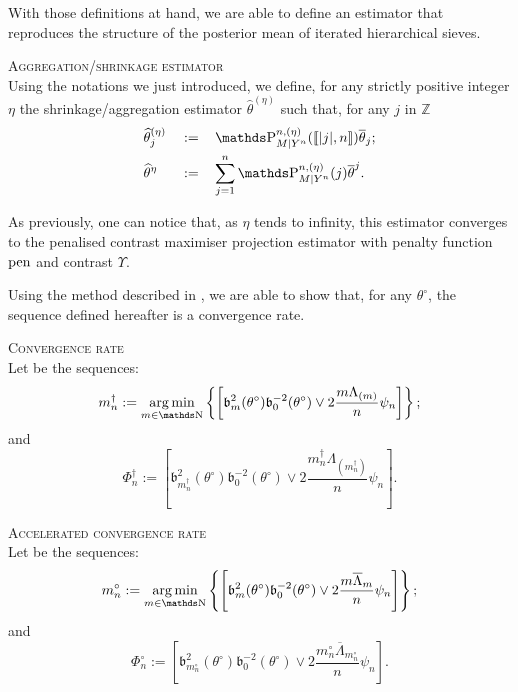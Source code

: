 With those definitions at hand, we are able to define an estimator that reproduces the structure of the posterior mean of iterated hierarchical sieves.

\begin{de}{\textsc{Aggregation/shrinkage estimator} \\}\label{DEFREQ_CIRCDECONV_KNOWN_IID_AGGREGEST}
Using the notations we just introduced, we define, for any strictly positive integer $\eta$ the shrinkage/aggregation estimator $\widehat{\theta}^{(\eta)}$ such that, for any $j$ in $\mathds{Z}$
\begin{alignat*}{3}
& \widehat{\theta}^{(\eta)}_{j} && := && \P_{M \vert Y^{n}}^{n, (\eta)}(\llbracket \vert j \vert, n \rrbracket) \overline{\theta}_{j};\\
& \widehat{\theta}^{\eta} && := && \sum\limits_{j = 1}^{n} \P_{M \vert Y^{n}}^{n, (\eta)}(j) \overline{\theta}^{j}.
\end{alignat*}
\end{de}

As previously, one can notice that, as $\eta$ tends to infinity, this estimator converges to the penalised contrast maximiser projection estimator with penalty function $\operatorname{pen}$ and contrast $\Upsilon$.

Using the method described in , we are able to show that, for any $\theta^{\circ}$, the sequence defined hereafter is a convergence rate.

\begin{de}{\textsc{Convergence rate} \\}\label{DE_FREQ_CIRCDECONV_KNOWN_IID_CONVRATE}
Let be the sequences:
\[m^{\dagger}_{n} := \argmin_{m \in \N}\left\{\left[\mathfrak{b}_{m}^{2}(\theta^{\circ})\mathfrak{b}_{0}^{-2}(\theta^{\circ}) \vee 2 \frac{m \Lambda_{(m)}}{n} \psi_{n}\right]\right\};\]
and
\[\Phi^{\dagger}_{n} := \left[\mathfrak{b}_{m^{\dagger}_{n}}^{2}(\theta^{\circ})\mathfrak{b}_{0}^{-2}(\theta^{\circ}) \vee 2 \frac{m^{\dagger}_{n} \Lambda_{(m^{\dagger}_{n})}}{n} \psi_{n}\right].\]
\end{de}

\begin{de}{\textsc{Accelerated convergence rate} \\}\label{DE_FREQ_CIRCDECONV_KNOWN_IID_CONVRATEFAST}
Let be the sequences:
\[m^{\circ}_{n} := \argmin_{m \in \N}\left\{\left[\mathfrak{b}_{m}^{2}(\theta^{\circ})\mathfrak{b}_{0}^{-2}(\theta^{\circ}) \vee 2 \frac{m \overline{\Lambda}_{m}}{n} \psi_{n}\right]\right\};\]
and
\[\Phi^{\circ}_{n} := \left[\mathfrak{b}_{m^{\circ}_{n}}^{2}(\theta^{\circ})\mathfrak{b}_{0}^{-2}(\theta^{\circ}) \vee 2 \frac{m^{\circ}_{n} \overline{\Lambda}_{m^{\circ}_{n}}}{n} \psi_{n}\right].\]
\end{de}


